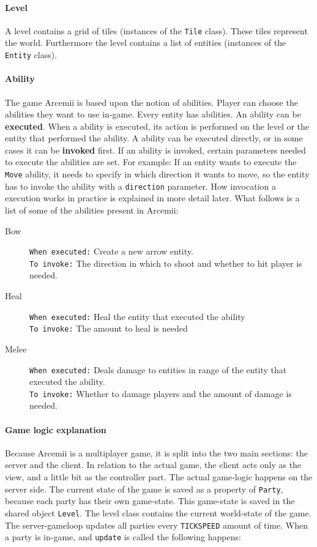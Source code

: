 \documentclass[../main.tex]{subfiles}
\begin{document}
        \paragraph{Level}
        A level contains a grid of tiles (instances of the \texttt{Tile} class). These tiles represent the world. Furthermore the level contains a list of entities (instances of the 
        \texttt{Entity} class).

        \paragraph{Ability}
        The game Arcemii is based upon the notion of abilities. Player can choose the abilities they want to use in-game. Every entity has abilities. An ability can be \textbf{executed}. When a ability is executed, its action is performed on the level or the entity that performed the ability. A ability can be executed directly, or in some cases it can be \textbf{invoked} first. If an ability is invoked, certain parameters needed to execute the abilities are set. For example: If an entity wants to execute the \texttt{Move} ability, it needs to specify in which direction it wants to move, so the entity has to invoke the ability with a \texttt{direction} parameter. How invocation a execution works in practice is explained in more detail later. What follows is a list of some of the abilities present in Arcemii:
        \begin{description}
            \item[Bow] \texttt{When executed:} Create a new arrow entity. \\
            \texttt{To invoke:} The direction in which to shoot and whether to hit player is needed.
            \item[Heal] \texttt{When executed:} Heal the entity that executed the ability \\
            \texttt{To invoke:} The amount to heal is needed
            \item[Melee] \texttt{When executed:} Deals damage to entities in range of the entity that executed the ability.\\
            \texttt{To invoke:} Whether to damage players and the amount of damage is needed.
        \end{description}

        \paragraph{Game logic explanation}
        Because Arcemii is a multiplayer game, it is split into the two main sections: the server and the client. In relation to the actual game, the client acts only as the view, and a little bit as the controller part. The actual game-logic happens on the server side. The current state of the game is saved as a property of \texttt{Party}, because each party has their own game-state. This game-state is saved in the shared object \texttt{Level}. The level class contains the current world-state of the game. The server-gameloop updates all parties every \texttt{TICKSPEED} amount of time. When a party is in-game, and \texttt{update} is called the following happens:
\end{document}
